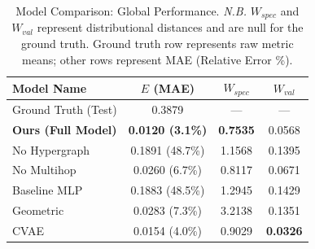 \documentclass[sigconf, review]{acmart}
\begin{document}
 
\begin{table}[h]
\caption{Model Comparison: Global Performance. 
\textit{N.B.} $W_{spec}$ and $W_{val}$ represent distributional distances and are null for the ground truth. Ground truth row represents raw metric means; other rows represent MAE (Relative Error \%).}
\label{tab:global_integration}
\centering
\begin{tabular}{lccc}
\toprule
\textbf{Model Name} & \textbf{$E$ (MAE)} & \textbf{$W_{spec}$} & \textbf{$W_{val}$} \\ 
\midrule
Ground Truth (Test) & 0.3879 & --- & --- \\ 
\midrule
\textbf{Ours (Full Model)} & \textbf{0.0120 (3.1\%)} & \textbf{0.7535} & 0.0568 \\
\midrule
No Hypergraph & 0.1891 (48.7\%) & 1.1568 & 0.1395 \\
No Multihop & 0.0260 (6.7\%) & 0.8117 & 0.0671 \\
Baseline MLP & 0.1883 (48.5\%) & 1.2945 & 0.1429 \\
\midrule
Geometric \cite{betzel_generative_2016} & 0.0283 (7.3\%) & 3.2138 & 0.1351 \\
CVAE \cite{liu_deep_2025} & 0.0154 (4.0\%) & 0.9029 & \textbf{0.0326} \\
\bottomrule
\end{tabular}
\end{table}
\end{document}
